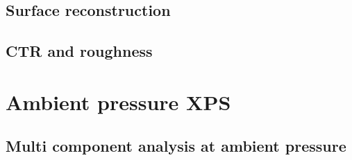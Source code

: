 \subsection{Surface reconstruction}
\lipsum

\subsection{CTR and roughness}

\lipsum

\section{Ambient pressure XPS}
\subsection{Multi component analysis at ambient pressure}

